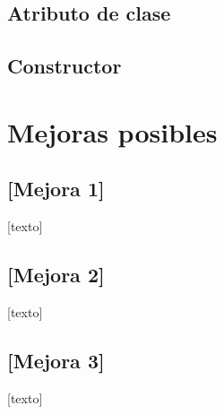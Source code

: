 \documentclass{article}
\newcommand{\insertverbbox}{{\addvbuffer[6pt 3pt]{\theverbbox}\par}}
\begin{document}
   	\begin{verbbox}
   		
   	\end{verbbox}
   	\insertverbbox  
   	
   	\subsection*{Atributo de clase}
   	
   	\begin{verbbox}
   		
   	\end{verbbox}
   	\insertverbbox
   	
	\subsection*{Constructor}
	   	
	\begin{verbbox}
	   		
	\end{verbbox}
	\insertverbbox
    
   	\section*{Mejoras posibles}
   	
   	\subsection*{[Mejora 1]}
	
	[texto]
	
	\subsection*{[Mejora 2]}
	
	[texto]
	
	\subsection*{[Mejora 3]}

	[texto]
\end{document}
